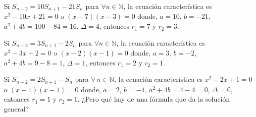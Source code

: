 \begin{example}{}
Si $S_{n+2}=10S_{n+1}-21S_n$ para $\forall n\in\mathds{N}$, la ecuación característica es $x^{2}-10x+21=0$ o $(x-7)(x-3)=0$ donde, $a=10$, $b=-21$, $a^2+4b=100-84=16$, $\Delta = 4$, entonces $r_{1}=7$ y $r_{2}=3$.
\end{example}

\begin{example}{}
Si $S_{n+2} = 3S_{n+1}-2S_{n}$ para $\forall n\in\mathds{N}$, la ecuación característica es $x^2-3x+2=0$ o $(x-2)(x-1)=0$ donde, $a=3$, $b=-2$, $a^2+4b=9-8=1$, $\Delta = 1$, entonces $r_1=2$ y $r_2=1$.
\end{example}

\begin{example}{}
Si $S_{n+2}=2S_{n+1}-S_{n}$ para $\forall\,n\in\mathds{N}$, la ecuación característica es $x^{2}-2x+1=0$ o $(x-1)(x-1)=0$ donde, $a=2$, $b=-1$, $a^2+4b=4-4=0$, $\Delta = 0$, entonces $r_{1}=1$ y $r_{2}=1$. ¿Pero qué hay de una fórmula que da la solución general?
\end{example}

